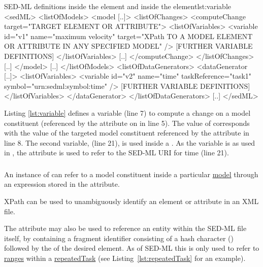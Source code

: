 %
\begin{myXmlLst}{SED-ML  definitions inside the  element and inside the  element}{lst:variable}
<sedML>
 <listOfModels>
  <model [..]>
   <listOfChanges>
    <computeChange target="TARGET ELEMENT OR ATTRIBUTE">
     <listOfVariables>
       <variable id="v1" name="maximum velocity" 
        target="XPath TO A MODEL ELEMENT OR ATTRIBUTE IN ANY SPECIFIED MODEL" />
      [FURTHER VARIABLE DEFINITIONS]
     </listOfVariables>
     [..]
    </computeChange>
   </listOfChanges>
   [..]
  </model>
  [..]
 </listOfModels>
 <listOfDataGenerators>
  <dataGenerator [..]>
   <listOfVariables>
    <variable id="v2" name="time" taskReference="task1" symbol="urn:sedml:symbol:time" />
      [FURTHER VARIABLE DEFINITIONS]
   </listOfVariables>
  </dataGenerator>
 </listOfDataGenerators>
 [..]
</sedML>
\end{myXmlLst}
%
Listing \ref{lst:variable} defines a variable  (line 7) to compute a change on a model constituent (referenced by the  attribute on  in line 5). The value of  corresponds with the value of the targeted model constituent referenced by the  attribute in line 8. 
The second variable,  (line 21), is used inside a . As the variable is  as used in , the  attribute is used to refer to the SED-ML URI for time (line 21).


\subsubsection{}
\label{sec:target}
An instance of  can refer to a model constituent inside a particular \hyperref[class:model]{model} through an  expression stored in the  attribute. 

XPath can be used to unambiguously identify an element or attribute in an XML file.

The  attribute may also be used to reference an entity within the SED-ML file itself, by containing a fragment identifier consisting of a hash character (\code{\#}) followed by the  of the desired element. As of SED-ML \currentLV this is only used to refer to \hyperref[sec:ranges]{ranges} within a \hyperref[class:repeatedTask]{repeatedTask} (see Listing~\ref{lst:repeatedTask} for an example).

